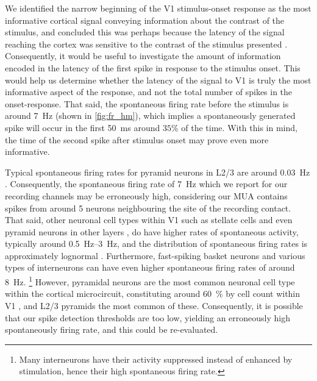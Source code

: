 We identified the narrow beginning of the \ac{V1} stimulus-onset response as the most informative cortical signal conveying information about the contrast of the stimulus, and concluded this was perhaps because the latency of the signal reaching the cortex was sensitive to the contrast of the stimulus presented \citep{Albrecht2002}.
Consequently, it would be useful to investigate the amount of information encoded in the latency of the first spike in response to the stimulus onset.
This would help us determine whether the latency of the signal to \ac{V1} is truly the most informative aspect of the response, and not the total number of spikes in the onset-response.
That said, the spontaneous firing rate before the stimulus is around \SI{7}{Hz} (shown in \autoref{fig:fr_hm}), which implies a spontaneously generated spike will occur in the first \SI{50}{\milli\second} around $35\%$ of the time.
With this in mind, the time of the second spike after stimulus onset may prove even more informative.

Typical spontaneous firing rates for pyramid neurons in \ac{L2/3} are around \SI{0.03}{Hz} \citep{Lutcke2015}.
Consequently, the spontaneous firing rate of \SI{7}{Hz} which we report for our recording channels may be erroneously high, considering our \ac{MUA} contains spikes from around \num{5} neurons neighbouring the site of the recording contact.
That said, other neuronal cell types within \ac{V1} such as stellate cells \citep{Iurilli2012,Iurilli2013} and even pyramid neurons in other layers \citep{Manns2004,Dani2005,Maffei2006,Hromadka2008}, do have higher rates of spontaneous activity, typically around \SIrange{0.5}{3}{Hz}, and the distribution of spontaneous firing rates is approximately lognormal \citep{Mizuseki2017}.
Furthermore, fast-spiking basket neurons \citep{Chadderton2009} and various types of interneurons \citep{Hanganu2009,Lutcke2015} can have even higher spontaneous firing rates of around \SI{8}{Hz}.%
\footnote{Many interneurons have their activity suppressed instead of enhanced by stimulation, hence their high spontaneous firing rate.}
However, pyramidal neurons are the most common neuronal cell type within the cortical microcircuit, constituting around \SI{60}{\percent} by cell count within \ac{V1} \citep{Binzegger2004}, and \ac{L2/3} pyramids the most common of these.
Consequently, it is possible that our spike detection thresholds are too low, yielding an erroneously high spontaneously firing rate, and this could be re-evaluated.

